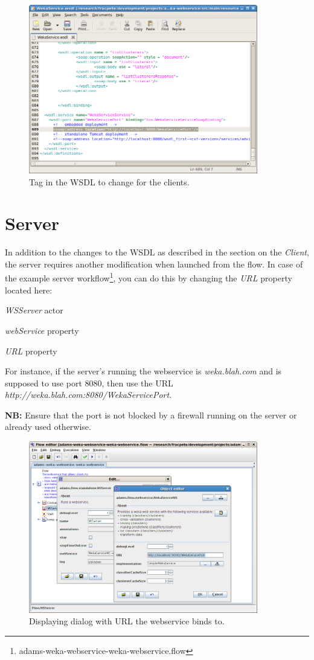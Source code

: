 \documentclass[a4paper]{book}
\begin{document}
\begin{figure}[htb]
  \centering
  \includegraphics[width=10.0cm]{images/client_setup.png}
  \caption{Tag in the WSDL to change for the clients.}
  \label{client_setup}
\end{figure}

\clearpage
\section{Server}
In addition to the changes to the WSDL as described in the section on the 
\textit{Client}, the server requires another modification
when launched from the flow. In case of the example server 
workflow\footnote{adams-weka-webservice-weka-webservice.flow},
you can do this by changing the \textit{URL} property located here:
\begin{tight_itemize}
	\item \textit{WSServer} actor
	\item \textit{webService} property
	\item \textit{URL} property
\end{tight_itemize}
For instance, if the server's running the webservice is \textit{weka.blah.com}
and is supposed to use port 8080, then use the URL 
\textit{http://weka.blah.com:8080/WekaServicePort}. 

\textbf{NB:} Ensure that the port is not blocked by a firewall running on the server
or already used otherwise.

\begin{figure}[htb]
  \centering
  \includegraphics[width=10.0cm]{images/server_setup.png}
  \caption{Displaying dialog with URL the webservice binds to.}
  \label{server_setup}
\end{figure}
\end{document}
